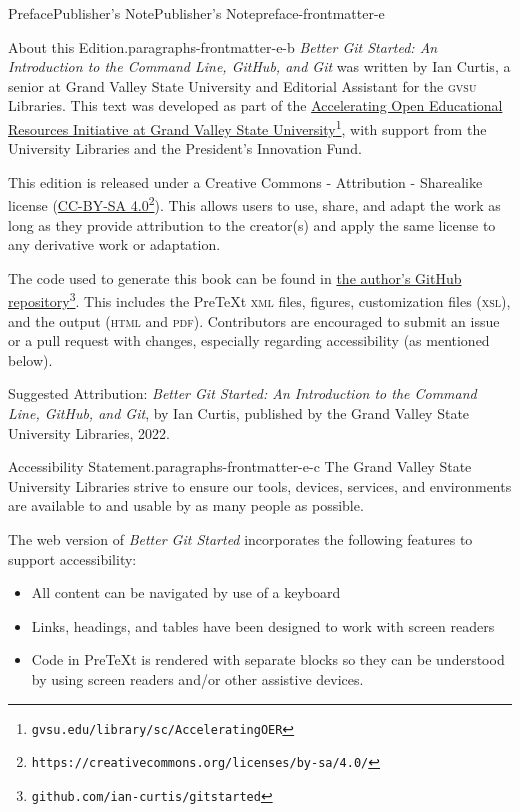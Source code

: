 \documentclass[twoside,10pt,]{book}
\newcommand{\initialism}[1]{\textsc{\MakeLowercase{#1}}}
\newcommand{\pubtitle}[1]{\textsl{#1}}
\begin{document}
\begin{preface}{Preface}{Publisher's Note}{}{Publisher's Note}{}{}{preface-frontmatter-e}
\begin{paragraphs}{About this Edition.}{paragraphs-frontmatter-e-b}%
\pubtitle{Better Git Started: An Introduction to the Command Line, GitHub, and Git} was written by Ian Curtis, a senior at Grand Valley State University and Editorial Assistant for the \initialism{GVSU} Libraries. This text was developed as part of the \href{https://www.gvsu.edu/library/sc/AcceleratingOER}{Accelerating Open Educational Resources Initiative at Grand Valley State University}\footnote{\nolinkurl{gvsu.edu/library/sc/AcceleratingOER}\label{fn-frontmatter-e-b-b-d}}, with support from the University Libraries and the President's Innovation Fund.%
\par
This edition is released under a Creative Commons - Attribution - Sharealike license (\href{https://creativecommons.org/licenses/by-sa/4.0/}{CC-BY-SA 4.0}\footnote{\nolinkurl{https://creativecommons.org/licenses/by-sa/4.0/}\label{fn-frontmatter-e-b-c-b}}). This allows users to use, share, and adapt the work as long as they provide attribution to the creator(s) and apply the same license to any derivative work or adaptation.%
\par
The code used to generate this book can be found in \href{https://github.com/ian-curtis/gitstarted}{the author's GitHub repository}\footnote{\nolinkurl{github.com/ian-curtis/gitstarted}\label{fn-frontmatter-e-b-d-b}}. This includes the PreTeXt \initialism{XML} files, figures, customization files (\initialism{XSL}), and the output (\initialism{HTML} and \initialism{PDF}). Contributors are encouraged to submit an issue or a pull request with changes, especially regarding accessibility (as mentioned below).%
\par
Suggested Attribution: \pubtitle{Better Git Started: An Introduction to the Command Line, GitHub, and Git}, by Ian Curtis, published by the Grand Valley State University Libraries, 2022.%
\end{paragraphs}%
\begin{paragraphs}{Accessibility Statement.}{paragraphs-frontmatter-e-c}%
The Grand Valley State University Libraries strive to ensure our tools, devices, services, and environments are available to and usable by as many people as possible.%
\par
The web version of \pubtitle{Better Git Started} incorporates the following features to support accessibility:%
\begin{itemize}[label=\textbullet]
\item{}All content can be navigated by use of a keyboard%
\item{}Links, headings, and tables have been designed to work with screen readers%
\item{}Code in PreTeXt is rendered with separate blocks so they can be understood by using screen readers and\slash{}or other assistive devices.%
\end{itemize}
%
\end{paragraphs}%
\end{preface}
\end{document}
